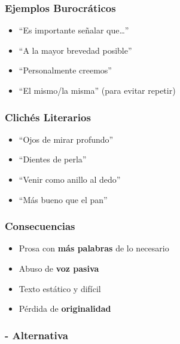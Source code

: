 \documentclass[
  11pt,
]{beaner}
\providecommand{\tightlist}{%
  \setlength{\itemsep}{0pt}\setlength{\parskip}{0pt}}
\begin{document}
\subsubsection{Ejemplos Burocráticos}\label{ejemplos-burocruxe1ticos}

\begin{itemize}
\tightlist
\item
  ``Es importante señalar que\ldots{}''\\
\item
  ``A la mayor brevedad posible''\\
\item
  ``Personalmente creemos''\\
\item
  ``El mismo/la misma'' (para evitar repetir)
\end{itemize}

\subsubsection{Clichés Literarios}\label{clichuxe9s-literarios}

\begin{itemize}
\tightlist
\item
  ``Ojos de mirar profundo''\\
\item
  ``Dientes de perla''\\
\item
  ``Venir como anillo al dedo''\\
\item
  ``Más bueno que el pan''\\
\end{itemize}

\subsubsection{Consecuencias}\label{consecuencias}

\begin{itemize}
\tightlist
\item
  Prosa con \textbf{más palabras} de lo necesario
\item
  Abuso de \textbf{voz pasiva}
\item
  Texto estático y difícil
\item
  Pérdida de \textbf{originalidad}
\end{itemize}

\subsubsection{- Alternativa}\label{alternativa}
\end{document}
